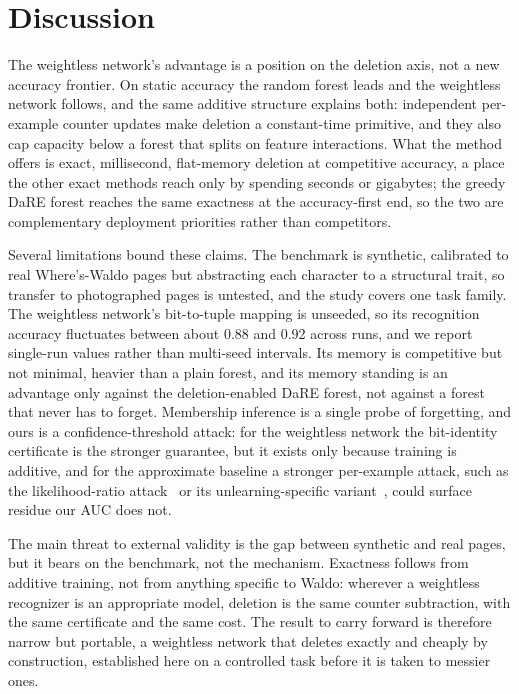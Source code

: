 \section{Discussion}
\label{sec:discussion}

The weightless network's advantage is a position on the deletion axis, not a new accuracy frontier. On static accuracy the random forest leads and the weightless network follows, and the same additive structure explains both: independent per-example counter updates make deletion a constant-time primitive, and they also cap capacity below a forest that splits on feature interactions. What the method offers is exact, millisecond, flat-memory deletion at competitive accuracy, a place the other exact methods reach only by spending seconds or gigabytes; the greedy DaRE forest reaches the same exactness at the accuracy-first end, so the two are complementary deployment priorities rather than competitors.

Several limitations bound these claims. The benchmark is synthetic, calibrated to real Where's-Waldo pages but abstracting each character to a structural trait, so transfer to photographed pages is untested, and the study covers one task family. The weightless network's bit-to-tuple mapping is unseeded, so its recognition accuracy fluctuates between about 0.88 and 0.92 across runs, and we report single-run values rather than multi-seed intervals. Its memory is competitive but not minimal, heavier than a plain forest, and its memory standing is an advantage only against the deletion-enabled DaRE forest, not against a forest that never has to forget. Membership inference is a single probe of forgetting, and ours is a confidence-threshold attack: for the weightless network the bit-identity certificate is the stronger guarantee, but it exists only because training is additive, and for the approximate baseline a stronger per-example attack, such as the likelihood-ratio attack~\cite{carlini2022lira} or its unlearning-specific variant~\cite{hayes2024ulira}, could surface residue our AUC does not.

The main threat to external validity is the gap between synthetic and real pages, but it bears on the benchmark, not the mechanism. Exactness follows from additive training, not from anything specific to Waldo: wherever a weightless recognizer is an appropriate model, deletion is the same counter subtraction, with the same certificate and the same cost. The result to carry forward is therefore narrow but portable, a weightless network that deletes exactly and cheaply by construction, established here on a controlled task before it is taken to messier ones.
